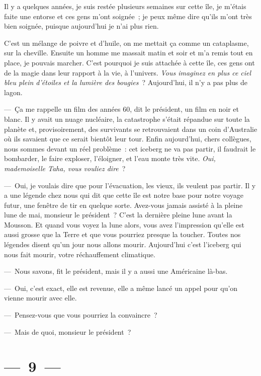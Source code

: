 \documentclass[twoside]{book} %
\begin{document}
Il y a quelques années, je suis restée plusieurs semaines sur cette île, je m’étais faite une entorse et ces gens m’ont soignée ; je peux même dire qu’ils m’ont très bien soignée, puisque aujourd’hui je n’ai plus rien.\par
C’est un mélange de poivre et d’huile, on me mettait ça comme un cataplasme, sur la cheville. Ensuite un homme me massait matin et soir et m’a remis tout en place, je pouvais marcher. C’est pourquoi je suis attachée à cette île, ces gens ont de la magie dans leur rapport à la vie, à l’univers. \emph{Vous imaginez en plus ce ciel bleu plein d’étoiles et la lumière des bougies} ? Aujourd’hui, il n’y a pas plus de lagon.\par
— Ça me rappelle un film des années 60, dit le président, un film en noir et blanc. Il y avait un nuage nucléaire, la catastrophe s’était répandue sur toute la planète et, provisoirement, des survivants se retrouvaient dans un coin d’Australie où ils savaient que ce serait bientôt leur tour. Enfin aujourd’hui, chers collègues, nous sommes devant un réel problème : cet iceberg ne va pas partir, il faudrait le bombarder, le faire exploser, l’éloigner, et l’eau monte très vite. \emph{Oui, mademoiselle Taha, vous vouliez dire} ?\par
— Oui, je voulais dire que pour l’évacuation, les vieux, ils veulent pas partir. Il y a une légende chez nous qui dit que cette île est notre base pour notre voyage futur, une fenêtre de tir en quelque sorte. Avez-vous jamais assisté à la pleine lune de mai, monsieur le président ? C’est la dernière pleine lune avant la Mousson. Et quand vous voyez la lune alors, vous avez l’impression qu’elle est aussi grosse que la Terre et que vous pourriez presque la toucher. Toutes nos légendes disent qu’un jour nous allons mourir. Aujourd’hui c’est l’iceberg qui nous fait mourir, votre réchauffement climatique.\par
— Nous savons, fit le président, mais il y a aussi une Américaine là-bas.\par
— Oui, c’est exact, elle est revenue, elle a même lancé un appel pour qu’on vienne mourir avec elle.\par
— Pensez-vous que vous pourriez la convaincre ?\par
— Mais de quoi, monsieur le président ?

\section[{— 9 —}]{— 9 —}
\renewcommand{\leftmark}{— 9 —}
\end{document}
